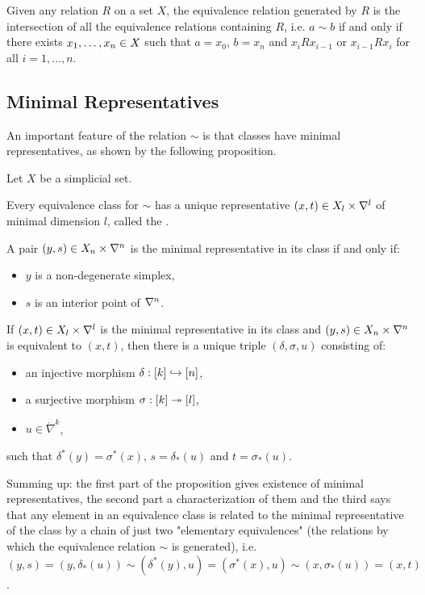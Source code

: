 \begin{remark*}
Given any relation $R$ on a set $X$, the equivalence relation generated by $R$ is the intersection of all the equivalence relations containing $R$, i.e. $a\sim b$ if and only if there exists ${x_1,\dots,x_n}\in X$ such that $a=x_0$, $b=x_n$ and $x_iRx_{i-1}$ or $x_{i-1}Rx_i$ for all $i=1,\dots,n$.
\end{remark*}

\subsection{Minimal Representatives}\label{subsection:minimal-representatives}

An important feature of the relation $\sim$ is that classes have minimal representatives, as shown by the following proposition.

\begin{proposition}\label{proposition:minimal-representatives}
Let $X$ be a simplicial set.
\begin{numerate}
\item Every equivalence class for $\sim$ has a unique representative $(x,t)\in X_l\times\nabla^{l}$ of minimal dimension $l$, called the .
\item A pair $(y,s)\in X_n\times\nabla^n$ is the minimal representative in its class if and only if:
\begin{itemize}[label={-}]
    \item $y$ is a non-degenerate simplex,
    \item $s$ is an interior point of $\nabla^n$.
\end{itemize}
\item If $(x,t)\in X_l\times\nabla^{l}$ is the minimal representative in its class and $(y,s)\in X_n\times\nabla^n$ is equivalent to $(x,t)$, then there is a unique triple $(\delta,\sigma,u)$ consisting of:
\begin{itemize}[label={-}]
    \item an injective morphism $\delta:[k]\hookrightarrow[n]$,
    \item a surjective morphism $\sigma:[k]\twoheadrightarrow[l]$,
    \item $u\in\ring\nabla^{k}$,
\end{itemize}
such that $\delta^*(y)=\sigma^*(x)$, $s=\delta_*(u)$ and $t=\sigma_*(u)$.
\end{numerate}
\end{proposition}

Summing up: the first part of the proposition gives existence of minimal representatives, the second part a characterization of them and the third says that any element in an equivalence class is related to the minimal representative of the class by a chain of just two "elementary equivalences" (the relations by which the equivalence relation $\sim$ is generated), i.e. $(y,s)=(y,\delta_*(u))\sim(\delta^*(y),u)=(\sigma^*(x),u)\sim(x,\sigma_*(u))=(x,t)$.

